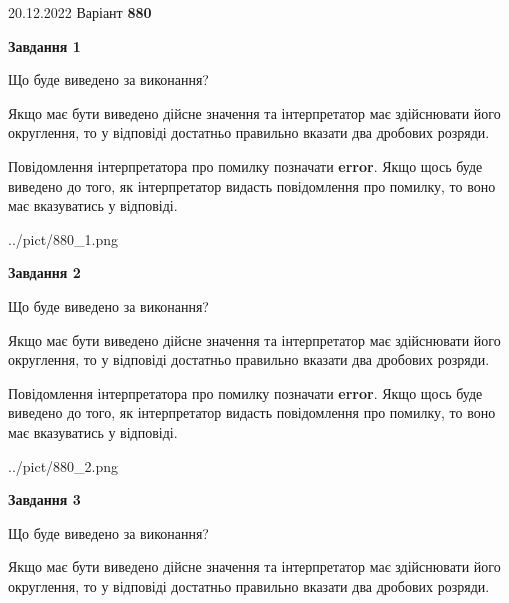 \documentclass[12pt, ukrainian]{article}
\begin{document}
{20.12.2022 Варіант \No \textbf { 880 }\par}
{
\begin {Large}

{\begin {center}\textbf{Завдання 1}\end {center}}\par
Що буде виведено за виконання? \par

Якщо має бути виведено дійсне значення та інтерпретатор має здійснювати його округлення, 
то у відповіді достатньо правильно вказати два дробових розряди.

Повідомлення інтерпретатора про помилку позначати \textbf{error}.
Якщо щось буде виведено до того, як інтерпретатор видасть повідомлення про помилку, 
то воно має вказуватись у відповіді. \par

\begin{center}
	{../pict/880_1.png}
\end{center}
\newpage

{\begin {center}\textbf{Завдання 2}\end {center}}\par
Що буде виведено за виконання? \par

Якщо має бути виведено дійсне значення та інтерпретатор має здійснювати його округлення, 
то у відповіді достатньо правильно вказати два дробових розряди.

Повідомлення інтерпретатора про помилку позначати \textbf{error}.
Якщо щось буде виведено до того, як інтерпретатор видасть повідомлення про помилку, 
то воно має вказуватись у відповіді. \par

\begin{center}
	{../pict/880_2.png}
\end{center}
\newpage

{\begin {center}\textbf{Завдання 3}\end {center}}\par
Що буде виведено за виконання? \par

Якщо має бути виведено дійсне значення та інтерпретатор має здійснювати його округлення, 
то у відповіді достатньо правильно вказати два дробових розряди.


\end{Large}}
\end{document}
